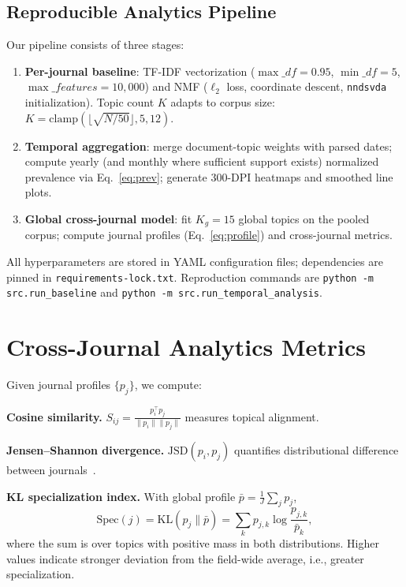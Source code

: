 \documentclass[conference]{IEEEtran}
\begin{document}
\subsection{Reproducible Analytics Pipeline}
Our pipeline consists of three stages:
\begin{enumerate}
  \item \textbf{Per-journal baseline}: TF-IDF vectorization ($\max\_df=0.95$, $\min\_df=5$, $\max\_features=10{,}000$) and NMF ($\ell_2$ loss, coordinate descent, \texttt{nndsvda} initialization).
  Topic count $K$ adapts to corpus size: $K=\mathrm{clamp}(\lfloor\sqrt{N/50}\rfloor, 5, 12)$.
  \item \textbf{Temporal aggregation}: merge document-topic weights with parsed dates; compute yearly (and monthly where sufficient support exists) normalized prevalence via Eq.~\eqref{eq:prev}; generate 300-DPI heatmaps and smoothed line plots.
  \item \textbf{Global cross-journal model}: fit $K_g=15$ global topics on the pooled corpus; compute journal profiles (Eq.~\eqref{eq:profile}) and cross-journal metrics.
\end{enumerate}
All hyperparameters are stored in YAML configuration files; dependencies are pinned in \texttt{requirements-lock.txt}.
Reproduction commands are \texttt{python -m src.run\_baseline} and \texttt{python -m src.run\_temporal\_analysis}.

\section{Cross-Journal Analytics Metrics}
\label{sec:metrics}

Given journal profiles $\{p_j\}$, we compute:

\textbf{Cosine similarity.} $S_{ij}=\frac{p_i^\top p_j}{\|p_i\|\|p_j\|}$ measures topical alignment.

\textbf{Jensen--Shannon divergence.} $\mathrm{JSD}(p_i,p_j)$ quantifies distributional difference between journals~\cite{lin1991jsd}.

\textbf{KL specialization index.} With global profile $\bar{p}=\frac{1}{J}\sum_j p_j$,
\begin{equation}
\mathrm{Spec}(j)=\mathrm{KL}(p_j\|\bar{p})=\sum_k p_{j,k}\log\frac{p_{j,k}}{\bar{p}_k},
\end{equation}
where the sum is over topics with positive mass in both distributions.
Higher values indicate stronger deviation from the field-wide average, i.e., greater specialization.
\end{document}
